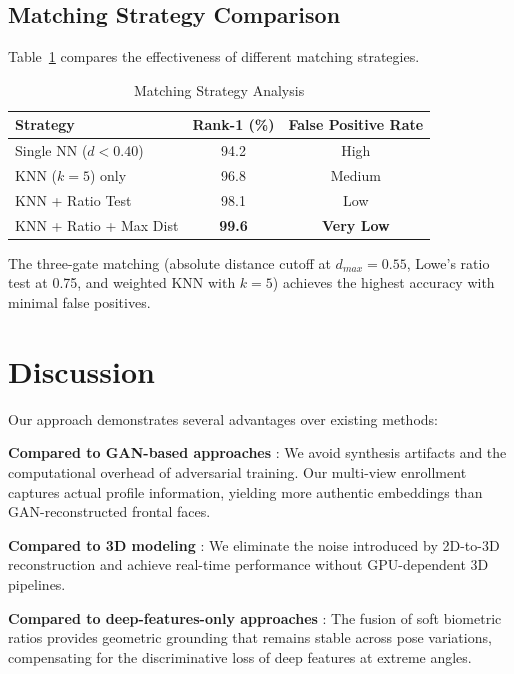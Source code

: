 \documentclass[conference]{IEEEtran}
\begin{document}
\subsection{Matching Strategy Comparison}

Table~\ref{tab:matching} compares the effectiveness of different matching strategies.

\begin{table}[htbp]
\caption{Matching Strategy Analysis}
\begin{center}
\begin{tabular}{lcc}
\toprule
\textbf{Strategy} & \textbf{Rank-1 (\%)} & \textbf{False Positive Rate} \\
\midrule
Single NN ($d < 0.40$) & 94.2 & High \\
KNN ($k=5$) only & 96.8 & Medium \\
KNN + Ratio Test & 98.1 & Low \\
KNN + Ratio + Max Dist & \textbf{99.6} & \textbf{Very Low} \\
\bottomrule
\end{tabular}
\label{tab:matching}
\end{center}
\end{table}

The three-gate matching (absolute distance cutoff at $d_{max} = 0.55$, Lowe's ratio test at 0.75, and weighted KNN with $k=5$) achieves the highest accuracy with minimal false positives.

\section{Discussion}

Our approach demonstrates several advantages over existing methods:

\textbf{Compared to GAN-based approaches} \cite{b3}: We avoid synthesis artifacts and the computational overhead of adversarial training. Our multi-view enrollment captures actual profile information, yielding more authentic embeddings than GAN-reconstructed frontal faces.

\textbf{Compared to 3D modeling} \cite{b5}: We eliminate the noise introduced by 2D-to-3D reconstruction and achieve real-time performance without GPU-dependent 3D pipelines.

\textbf{Compared to deep-features-only approaches} \cite{b10, b11}: The fusion of soft biometric ratios provides geometric grounding that remains stable across pose variations, compensating for the discriminative loss of deep features at extreme angles.
\end{document}
